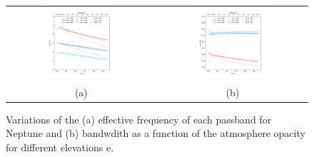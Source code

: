 \begin{figure}[ht!] %
\begin{center}
\begin{tabular}{cc}
\includegraphics[clip,trim={0, 1cm, 0,
  2cm},width=0.5\textwidth]{Figures/SpectralBands/nika2_centfreq.png}
& \includegraphics[clip,trim={0, 1cm, 0,
  2cm},width=0.5\textwidth]{Figures/SpectralBands/nika2_bandwidths.png}\\
(a) & (b) \\
\end{tabular}
\caption[Atmosphere effect on system transmission]{Variations of the
  (a) effective frequency of each passband for Neptune and (b)
  bandwdith as a function of the atmosphere opacity for different
  elevations e. } 
 \label{fig:atmosphereimpact}
\end{center}
\end{figure}

 



